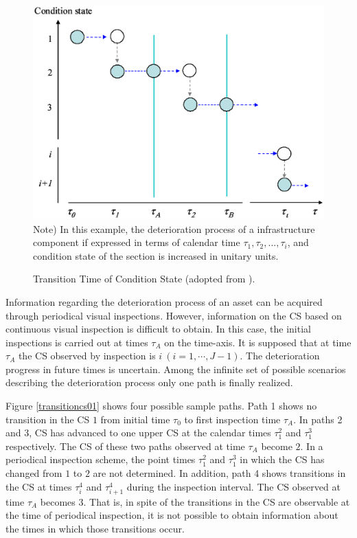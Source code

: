 \begin{figure}[!htb]
		\includegraphics[scale=0.4]{figures/transitioncs.eps} \\
	\footnotesize Note) In this example, the deterioration process of a infrastructure component if expressed in terms of calendar time $\tau_1, \tau_2,...,\tau_i$, and condition state of the section is increased in unitary units.
	\caption{Transition Time of Condition State (adopted from \cite{Lethanh2009c}).}
	\label{transitioncs} 
\end{figure}
%
Information regarding the deterioration process of an asset can be acquired through periodical visual inspections. However, information on the CS based on continuous visual inspection is difficult to obtain. In this case, the initial inspections is carried out at times $\tau_A$ on the time-axis. It is supposed that at time $\tau_A$ the CS observed by inspection is $i~(i=1,\cdots,J-1)$. The deterioration progress in future times is uncertain. Among the infinite set of possible scenarios describing the deterioration process only one path is finally realized. 

Figure \ref{transitioncs01} shows four possible sample paths. Path 1 shows no transition in the CS $1$ from initial time $\tau_0$ to first inspection time $\tau_A$. In paths 2 and 3, CS has advanced to one upper CS at the calendar times $\tau_1^2$ and $\tau_1^3$ respectively. The CS of these two paths observed at time $\tau_A$ become $2$. In a periodical inspection scheme, the point times $\tau_1^2$ and $\tau_1^3$ in which the CS has changed from $1$ to $2$ are not determined. In addition, path 4 shows transitions in the CS at times $\tau_i^4$ and $\tau_{i+1}^4$ during the inspection interval. The CS observed at time $\tau_A$ becomes $3$. That is, in spite of the transitions in the CS are observable at the time of periodical inspection, it is not possible to obtain information about the times in which those transitions occur.

